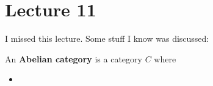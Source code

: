 \section{Lecture 11}
I missed this lecture. Some stuff I know was discussed:
\begin{definition}
    An \textbf{Abelian category} is a category $C$ where
    \begin{itemize}
        \item 
    \end{itemize}
\end{definition}